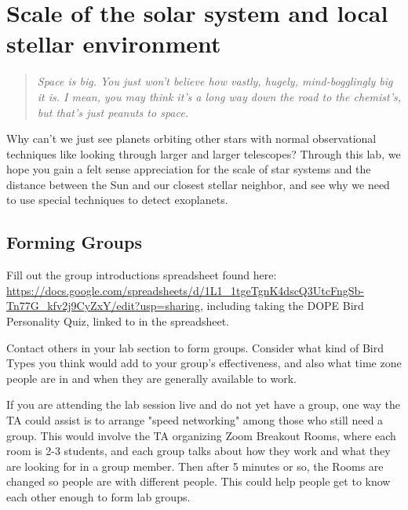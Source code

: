 \chapter{Scale of the solar system and local stellar environment}


\begin{quotation}
	\textit{Space is big. You just won't believe how vastly, hugely, mind-bogglingly big it is. I mean, you may think it's a long way down the road to the chemist's, but that's just peanuts to space.} 
\end{quotation}

Why can't we just see planets orbiting other stars with normal observational techniques like looking through larger and larger telescopes? Through this lab, we hope you gain a felt sense appreciation for the scale of star systems and the distance between the Sun and our closest stellar neighbor, and see why we need to use special techniques to detect exoplanets.

\section{Forming Groups}

\begin{steps}
	\item Fill out the group introductions spreadsheet found here: \url{https://docs.google.com/spreadsheets/d/1L1_1tgeTgnK4dscQ3UtcFngSb-Tn77G_kfv2j9CyZxY/edit?usp=sharing}, including taking the DOPE Bird Personality Quiz, linked to in the spreadsheet.
	
	\item Contact others in your lab section to form groups. Consider what kind of Bird Types you think would add to your group's effectiveness, and also what time zone people are in and when they are generally available to work.
\end{steps}

If you are attending the lab session live and do not yet have a group, one way the TA could assist is to arrange "speed networking" among those who still need a group. This would involve the TA organizing Zoom Breakout Rooms, where each room is 2-3 students, and each group talks about how they work and what they are looking for in a group member. Then after 5 minutes or so, the Rooms are changed so people are with different people. This could help people get to know each other enough to form lab groups.

